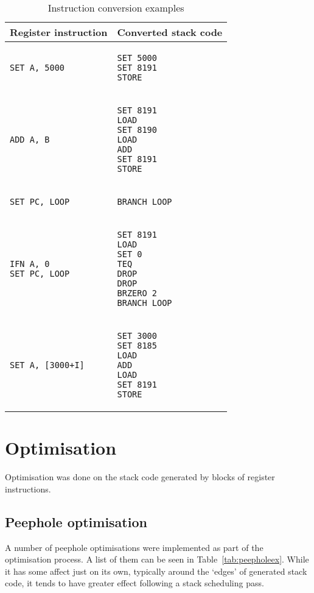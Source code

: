 \begin{table}
\caption{Instruction conversion examples}
\begin{tabular}{l l}\label{tab:conversionexs}
Register instruction & Converted stack code \\ \toprule
\begin{lstlisting}
SET A, 5000
\end{lstlisting} &
\begin{lstlisting}
SET 5000
SET 8191
STORE
\end{lstlisting} \\ \midrule
\begin{lstlisting}
ADD A, B
\end{lstlisting} &
\begin{lstlisting}
SET 8191
LOAD
SET 8190
LOAD
ADD
SET 8191
STORE
\end{lstlisting} \\ \midrule
\begin{lstlisting}
SET PC, LOOP
\end{lstlisting} &
\begin{lstlisting}
BRANCH LOOP
\end{lstlisting} \\ \midrule
\begin{lstlisting}
IFN A, 0
SET PC, LOOP
\end{lstlisting} &
\begin{lstlisting}
SET 8191
LOAD
SET 0
TEQ
DROP
DROP
BRZERO 2
BRANCH LOOP
\end{lstlisting} \\ \midrule
\begin{lstlisting}
SET A, [3000+I]
\end{lstlisting} &
\begin{lstlisting}
SET 3000
SET 8185
LOAD
ADD
LOAD
SET 8191
STORE
\end{lstlisting} \\
\end{tabular}
\end{table}


\section{Optimisation}
Optimisation was done on the stack code generated by blocks of register
instructions.

\subsection{Peephole optimisation}
A number of peephole optimisations were implemented as part of the optimisation
process. A list of them can be seen in Table~\ref{tab:peepholeex}. While it has
some affect just on its own, typically around the `edges' of generated stack
code, it tends to have greater effect following a stack scheduling pass.

